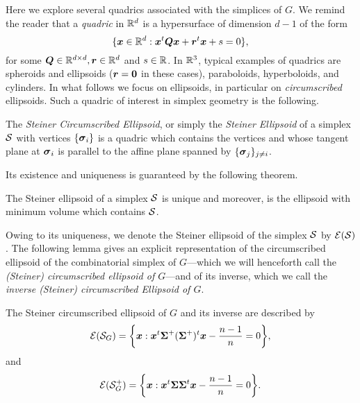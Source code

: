 Here we explore several quadrics associated with the simplices of $G$. 
We remind the reader that a  \emph{quadric} in $\mathbb{R}^d$ is a hypersurface of dimension $d-1$ of the form 
\begin{equation*}
\{\vb*{x}\in\mathbb{R}^d: \vb*{x}^t \vb*{Q}\vb*{x} + \vb*{r}^t \vb*{x} + s=0\},
\end{equation*}
for some $\vb*{Q}\in\mathbb{R}^{d\times d},\vb*{r}\in\mathbb{R}^d$  and $s\in \mathbb{R}$. 
In $\mathbb{R}^3$, typical examples of quadrics are spheroids and ellipsoids ($\vb*{r}=\vb{0}$ in these cases), paraboloids, hyperboloids, and  cylinders. In what follows we focus on ellipsoids, in particular on \emph{circumscribed} ellipsoids. Such a quadric of interest in simplex geometry is the following. 

\begin{definition}
\label{def:steiner_ellipsoid}
The \emph{Steiner Circumscribed Ellipsoid}, or simply the \emph{Steiner Ellipsoid} of a simplex $\mathcal{S}$ with vertices $\{\vb*{\sigma}_i\}$ is a quadric which contains the vertices and whose tangent plane at $\vb*{\sigma}_i$ is parallel to the affine plane spanned by $\{\vb*{\sigma}_j\}_{j\neq i}$. 
\end{definition}

Its existence  and uniqueness is guaranteed by the following theorem. 

\begin{theorem}
The Steiner ellipsoid of a simplex $\mathcal{S}$ is unique and moreover, is the ellipsoid with minimum volume which contains $\mathcal{S}$. 
\end{theorem}

Owing to its uniqueness, we denote the Steiner ellipsoid of the simplex $\mathcal{S}$ by $\mathcal{E}(\mathcal{S})$. The following lemma gives an explicit representation of the circumscribed ellipsoid of the combinatorial simplex of $G$---which we will  henceforth call the \emph{(Steiner) circumscribed ellipsoid of $G$}---and of its inverse, which we call the \emph{inverse (Steiner) circumscribed Ellipsoid of $G$}. 

\begin{lemma}
	\label{lem:El(S)}
The Steiner circumscribed ellipsoid  of $G$ and its inverse  are described by 
\begin{equation}
\label{eq:steinerE}
    \mathcal{E}(\mathcal{S}_G) = \bigg\{\vb*{x}: \vb*{x}^t \boldsymbol{\Sigma}^+(\boldsymbol{\Sigma}^+)^t \vb*{x} - \frac{n-1}{n}=0\bigg\},
\end{equation}
and 
\begin{equation}
\label{eq:steinerE_inverse}
\mathcal{E}(\mathcal{S}^+_G) = \bigg\{\vb*{x}: \vb*{x}^t \boldsymbol{\Sigma}\boldsymbol{\Sigma}^t \vb*{x} - \frac{n-1}{n}=0\bigg\}.
\end{equation}
\end{lemma}


